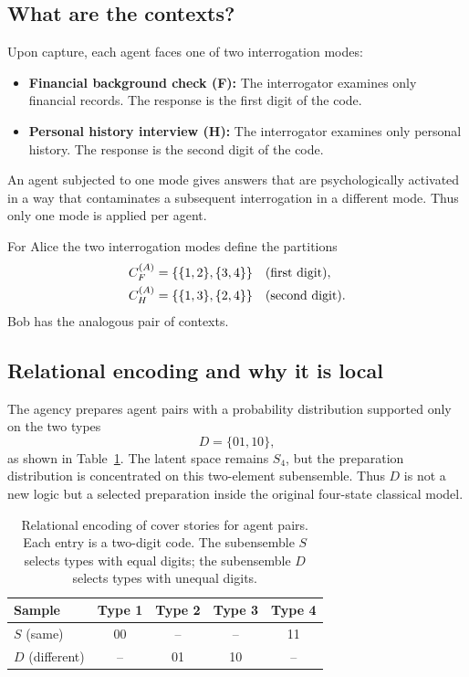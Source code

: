 \documentclass{article}
\providecommand{\colrule}{\hline}
\begin{document}
\subsection{What are the contexts?}

Upon capture, each agent faces one of two interrogation modes:
\begin{itemize}
\item \textbf{Financial background check (F):} The interrogator
examines only financial records. The response is the first digit of
the code.
\item \textbf{Personal history interview (H):} The interrogator
examines only personal history. The response is the second digit of
the code.
\end{itemize}
An agent subjected to one mode gives answers that are psychologically
activated in a way that contaminates a subsequent interrogation in a
different mode. Thus only one mode is applied per agent.

For Alice the two interrogation modes define the partitions
\begin{align}
C_F^{(A)} &= \{\{1,2\},\{3,4\}\}
\quad\text{(first digit)}, \notag\\
C_H^{(A)} &= \{\{1,3\},\{2,4\}\}
\quad\text{(second digit)}.
\label{eq:alice}
\end{align}
Bob has the analogous pair of contexts.

\subsection{Relational encoding and why it is local}

The agency prepares agent pairs with a probability distribution
supported only on the two types
\[
D=\{01,10\},
\]
as shown in Table~\ref{tab:relational}. The latent space remains
$S_4$, but the preparation distribution is concentrated on this
two-element subensemble. Thus $D$ is not a new logic but a selected
preparation inside the original four-state classical model.

\begin{table}[b]
\caption{\label{tab:relational}Relational encoding of cover
stories for agent pairs. Each entry is a two-digit code. The
subensemble $S$ selects types with equal digits; the subensemble
$D$ selects types with unequal digits.}
\begin{center}
\begin{tabular}{lcccc}
\colrule
Sample & Type 1 & Type 2 & Type 3 & Type 4\\
\colrule
$S$ (same)  & 00 &  --  &  --  & 11 \\
$D$ (different) &  --  & 01 & 10 &  --  \\
\colrule
\end{tabular}
\end{center}
\end{table}
\end{document}
